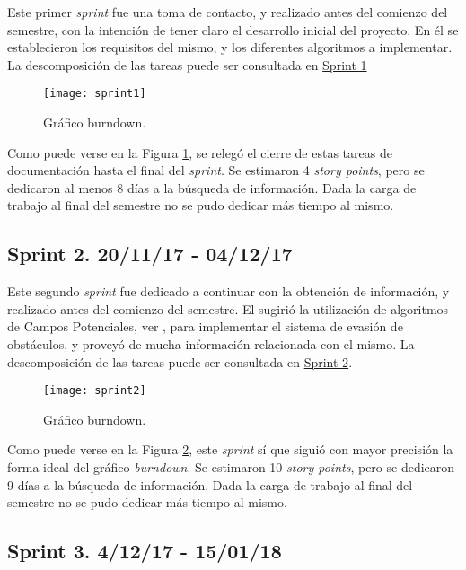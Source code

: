 Este primer \emph{sprint} fue una toma de contacto, y realizado antes del comienzo del semestre, con la intención de tener claro el desarrollo inicial del proyecto. 
En él se establecieron los requisitos del mismo, y los diferentes algoritmos a implementar. 
La descomposición de las tareas puede ser consultada en \href{https://github.com/mbm0089/gii_0_17.02_snsi/milestone/1?closed=1}{Sprint 1}

\begin{figure}
	\centering
	\texttt{[image: sprint1]}
	\caption[Burndown Sprint 1]{Gráfico burndown.}\label{fig:sprint1}
\end{figure}

Como puede verse en la Figura \ref{fig:sprint1}, se relegó el cierre de estas tareas de documentación hasta el final del \emph{sprint}.
Se estimaron 4 \emph{story points}, pero se dedicaron al menos 8 días a la búsqueda de información. Dada la carga de trabajo al final del semestre no se pudo dedicar más tiempo al mismo.

\subsection{Sprint 2. 20/11/17 - 04/12/17}

Este segundo \emph{sprint} fue dedicado a continuar con la obtención de información, y realizado antes del comienzo del semestre.
El \tutor{} sugirió la utilización de algoritmos de Campos Potenciales, ver \citep{art:BorensteinLims}, para implementar el sistema de evasión de obstáculos, y proveyó de mucha información relacionada con el mismo.
La descomposición de las tareas puede ser consultada en \href{https://github.com/mbm0089/gii_0_17.02_snsi/milestone/2?closed=1}{Sprint 2}.

\begin{figure}
	\centering
	\texttt{[image: sprint2]}
	\caption[Burndown Sprint 2]{Gráfico burndown.}\label{fig:sprint2}
\end{figure}

Como puede verse en la Figura \ref{fig:sprint2}, este \emph{sprint} sí que siguió con mayor precisión la forma ideal del gráfico \emph{burndown}.
Se estimaron 10 \emph{story points}, pero se dedicaron 9 días a la búsqueda de información. Dada la carga de trabajo al final del semestre no se pudo dedicar más tiempo al mismo.

\subsection{Sprint 3. 4/12/17 - 15/01/18}

